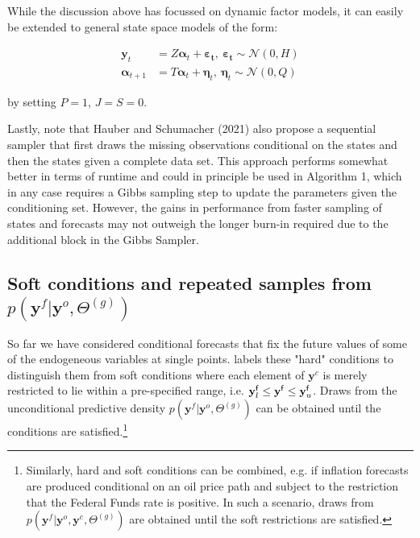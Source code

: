 \documentclass[notitlepage,a4paper,12pt]{article}
\begin{document}
While the discussion above has focussed on dynamic factor models, it can easily be extended to general state space models of the form:

\begin{subequations}
    \label{eqn:statespacesys}
    \begin{align}
    \mathbf{y}_t &= Z \boldsymbol{\alpha}_t + \boldsymbol{\varepsilon_t}, \: \boldsymbol{\varepsilon_t} \sim \mathcal{N}(0, H) \\
    \boldsymbol{\alpha}_{t+1} &= T \boldsymbol{\alpha}_t + \boldsymbol{\eta}_t, \: \boldsymbol{\eta}_t \sim \mathcal{N}(0, Q) 
    \end{align}
\end{subequations}

by setting $P=1$, $J=S=0$.

Lastly, note that Hauber and Schumacher (2021) also propose a sequential sampler that first draws the missing observations conditional on the states and then the states given a complete data set. This approach performs somewhat better in terms of runtime and could in principle be used in Algorithm 1, which in any case requires a Gibbs sampling step to update the parameters given the conditioning set. However, the gains in performance from faster sampling of states and forecasts may not outweigh the longer burn-in required due to the additional block in the Gibbs Sampler.



\subsection{Soft conditions and repeated samples from $p(\mathbf{y}^f|\mathbf{y}^o, \Theta^{(g)})$}\label{subsec:softcond}

So far we have considered conditional forecasts that fix the future values of some of the endogeneous variables at single points. \citet{waggonerzha1999_res} labels these "hard" conditions to distinguish them from soft conditions where each element of $\mathbf{y}^c$ is merely restricted to lie within a pre-specified range, i.e. $\mathbf{y}^{\sf{f}}_l \leq \mathbf{y}^{\sf{f}} \leq \mathbf{y}^{\sf{f}}_u$. Draws from the unconditional predictive density $p(\mathbf{y}^f|\mathbf{y}^o, \Theta^{(g)})$ can be obtained until the conditions are satisfied.\footnote{Similarly, hard and soft conditions can be combined, e.g. if inflation forecasts are produced conditional on an oil price path and subject to the restriction that the Federal Funds rate is positive. In such a scenario, draws from $p(\mathbf{y}^f|\mathbf{y}^o, \mathbf{y}^c, \Theta^{(g)})$ are obtained until the soft restrictions are satisfied.}
\end{document}
